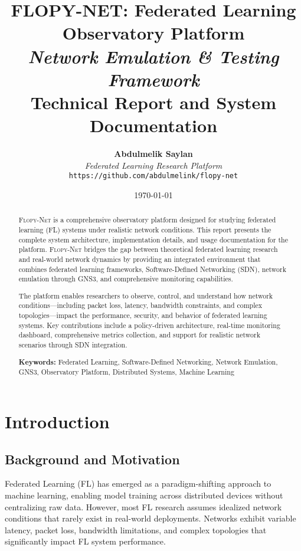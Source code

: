 \documentclass[12pt,a4paper,twoside]{article}
\title{
    \Huge\textbf{FLOPY-NET: Federated Learning Observatory Platform} \\
    \vspace{0.5cm}
    \Large\textit{Network Emulation \& Testing Framework} \\
    \vspace{1cm}
    \large Technical Report and System Documentation
}
\author{
    \textbf{Abdulmelik Saylan} \\
    \textit{Federated Learning Research Platform} \\
    \vspace{0.5cm}
    \texttt{https://github.com/abdulmelink/flopy-net}
}
\date{\today}
\newcommand{\flopynet}{\textsc{Flopy-Net}}
\begin{document}
\maketitle
\thispagestyle{empty}

\newpage

\begin{abstract}
\flopynet{} is a comprehensive observatory platform designed for studying federated learning (FL) systems under realistic network conditions. This report presents the complete system architecture, implementation details, and usage documentation for the platform. \flopynet{} bridges the gap between theoretical federated learning research and real-world network dynamics by providing an integrated environment that combines federated learning frameworks, Software-Defined Networking (SDN), network emulation through GNS3, and comprehensive monitoring capabilities.

The platform enables researchers to observe, control, and understand how network conditions—including packet loss, latency, bandwidth constraints, and complex topologies—impact the performance, security, and behavior of federated learning systems. Key contributions include a policy-driven architecture, real-time monitoring dashboard, comprehensive metrics collection, and support for realistic network scenarios through SDN integration.

\textbf{Keywords:} Federated Learning, Software-Defined Networking, Network Emulation, GNS3, Observatory Platform, Distributed Systems, Machine Learning
\end{abstract}

\newpage

\tableofcontents
\newpage

\listoffigures
\newpage

\listoftables
\newpage

\section{Introduction}

\subsection{Background and Motivation}

Federated Learning (FL) has emerged as a paradigm-shifting approach to machine learning, enabling model training across distributed devices without centralizing raw data. However, most FL research assumes idealized network conditions that rarely exist in real-world deployments. Networks exhibit variable latency, packet loss, bandwidth limitations, and complex topologies that significantly impact FL system performance.
\end{document}
